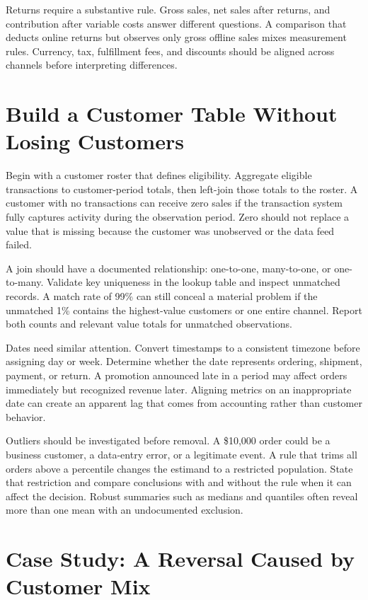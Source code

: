 Returns require a substantive rule. Gross sales, net sales after
returns, and contribution after variable costs answer different
questions. A comparison that deducts online returns but observes only
gross offline sales mixes measurement rules. Currency, tax, fulfillment
fees, and discounts should be aligned across channels before
interpreting differences.

\hypertarget{M02-build-a-customer-table-without-losing-customers}{%
\section{Build a Customer Table Without Losing
Customers}\label{M02-build-a-customer-table-without-losing-customers}}

\noindent Begin with a customer roster that defines eligibility. Aggregate
eligible transactions to customer-period totals, then left-join those
totals to the roster. A customer with no transactions can receive zero
sales if the transaction system fully captures activity during the
observation period. Zero should not replace a value that is missing
because the customer was unobserved or the data feed failed.

A join should have a documented relationship: one-to-one, many-to-one,
or one-to-many. Validate key uniqueness in the lookup table and inspect
unmatched records. A match rate of 99\% can still conceal a material
problem if the unmatched 1\% contains the highest-value customers or one
entire channel. Report both counts and relevant value totals for
unmatched observations.

Dates need similar attention. Convert timestamps to a consistent
timezone before assigning day or week. Determine whether the date
represents ordering, shipment, payment, or return. A promotion announced
late in a period may affect orders immediately but recognized revenue
later. Aligning metrics on an inappropriate date can create an apparent
lag that comes from accounting rather than customer behavior.

Outliers should be investigated before removal. A \$10,000 order could
be a business customer, a data-entry error, or a legitimate event. A
rule that trims all orders above a percentile changes the estimand to a
restricted population. State that restriction and compare conclusions
with and without the rule when it can affect the decision. Robust
summaries such as medians and quantiles often reveal more than one mean
with an undocumented exclusion.

\hypertarget{M02-case-study-a-reversal-caused-by-customer-mix}{%
\section{Case Study: A Reversal Caused by Customer
Mix}\label{M02-case-study-a-reversal-caused-by-customer-mix}}

